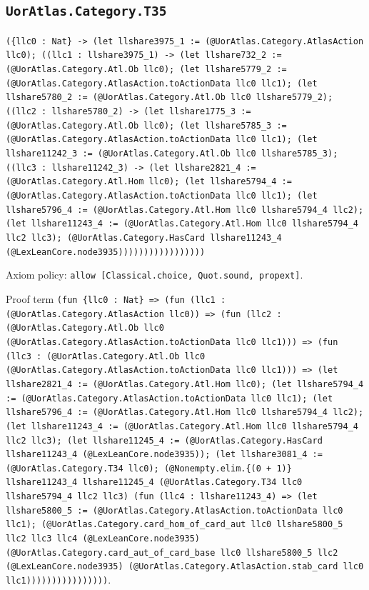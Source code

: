 \documentclass[11pt]{article}
\begin{document}
\subsection*{\texttt{UorAtlas.Category.T35}}
\noindent\texttt{(\{llc0 : Nat\} -> (let llshare3975\_1 := (@UorAtlas.Category.AtlasAction llc0); ((llc1 : llshare3975\_1) -> (let llshare732\_2 := (@UorAtlas.Category.Atl.Ob llc0); (let llshare5779\_2 := (@UorAtlas.Category.AtlasAction.toActionData llc0 llc1); (let llshare5780\_2 := (@UorAtlas.Category.Atl.Ob llc0 llshare5779\_2); ((llc2 : llshare5780\_2) -> (let llshare1775\_3 := (@UorAtlas.Category.Atl.Ob llc0); (let llshare5785\_3 := (@UorAtlas.Category.AtlasAction.toActionData llc0 llc1); (let llshare11242\_3 := (@UorAtlas.Category.Atl.Ob llc0 llshare5785\_3); ((llc3 : llshare11242\_3) -> (let llshare2821\_4 := (@UorAtlas.Category.Atl.Hom llc0); (let llshare5794\_4 := (@UorAtlas.Category.AtlasAction.toActionData llc0 llc1); (let llshare5796\_4 := (@UorAtlas.Category.Atl.Hom llc0 llshare5794\_4 llc2); (let llshare11243\_4 := (@UorAtlas.Category.Atl.Hom llc0 llshare5794\_4 llc2 llc3); (@UorAtlas.Category.HasCard llshare11243\_4 (@LexLeanCore.node3935)))))))))))))))))}\par
\noindent Axiom policy: \texttt{allow [Classical.choice, Quot.sound, propext]}.\par
\noindent Proof term \texttt{(fun \{llc0 : Nat\} => (fun (llc1 : (@UorAtlas.Category.AtlasAction llc0)) => (fun (llc2 : (@UorAtlas.Category.Atl.Ob llc0 (@UorAtlas.Category.AtlasAction.toActionData llc0 llc1))) => (fun (llc3 : (@UorAtlas.Category.Atl.Ob llc0 (@UorAtlas.Category.AtlasAction.toActionData llc0 llc1))) => (let llshare2821\_4 := (@UorAtlas.Category.Atl.Hom llc0); (let llshare5794\_4 := (@UorAtlas.Category.AtlasAction.toActionData llc0 llc1); (let llshare5796\_4 := (@UorAtlas.Category.Atl.Hom llc0 llshare5794\_4 llc2); (let llshare11243\_4 := (@UorAtlas.Category.Atl.Hom llc0 llshare5794\_4 llc2 llc3); (let llshare11245\_4 := (@UorAtlas.Category.HasCard llshare11243\_4 (@LexLeanCore.node3935)); (let llshare3081\_4 := (@UorAtlas.Category.T34 llc0); (@Nonempty.elim.\{(0 + 1)\} llshare11243\_4 llshare11245\_4 (@UorAtlas.Category.T34 llc0 llshare5794\_4 llc2 llc3) (fun (llc4 : llshare11243\_4) => (let llshare5800\_5 := (@UorAtlas.Category.AtlasAction.toActionData llc0 llc1); (@UorAtlas.Category.card\_hom\_of\_card\_aut llc0 llshare5800\_5 llc2 llc3 llc4 (@LexLeanCore.node3935) (@UorAtlas.Category.card\_aut\_of\_card\_base llc0 llshare5800\_5 llc2 (@LexLeanCore.node3935) (@UorAtlas.Category.AtlasAction.stab\_card llc0 llc1))))))))))))))))}.\par
\end{document}
